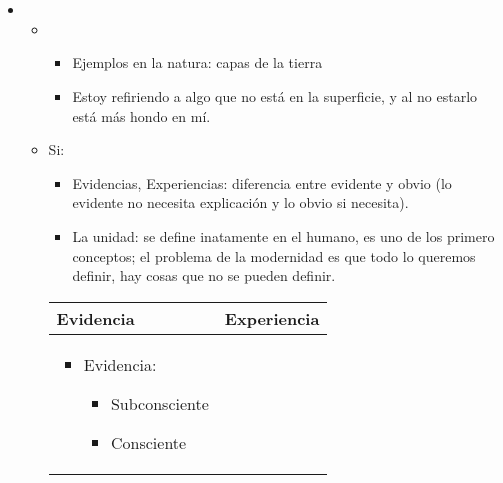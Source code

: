 \section{}
\begin{itemize}
    \item {} 
        \begin{itemize}[label=\#]
            \item {} 
                \begin{itemize}
                    \item Ejemplos en la natura: capas de la tierra 
                    \item Estoy refiriendo a algo que no está en la superficie, y al no estarlo está más hondo en mí.
                \end{itemize}
        \end{itemize}
        \begin{itemize}
            \item Si:
                \begin{itemize}
                    \item Evidencias, Experiencias: diferencia entre evidente y obvio (lo evidente no necesita explicación y lo obvio si necesita).
                    \item La unidad: se define inatamente en el humano, es uno de los primero conceptos; el problema de la modernidad es que todo lo queremos definir, hay cosas que no se pueden definir.
                \end{itemize}
                \begin{center}
                   \begin{tabular}{ | p{5cm} | p{5cm} | }
                       \hline
                            Evidencia & Experiencia    \\
                       \hline
                            \begin{itemize}
                                \item Evidencia:
                                    \begin{itemize}
                                        \item Subconsciente 
                                        \item Consciente 
                                    \end{itemize}
                                

\end{itemize}
\end{tabular}
\end{center}
\end{itemize}
\end{itemize}
